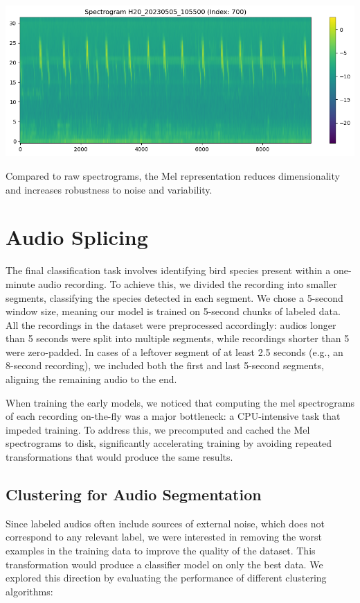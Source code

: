 \documentclass[10pt]{article}
\begin{document}
\begin{center}
  \includegraphics[width=0.7\linewidth]{img/scape_spectrogram.png}
\end{center}

Compared to raw spectrograms, the Mel representation reduces dimensionality and increases robustness to noise and variability. 

\section*{Audio Splicing}

The final classification task involves identifying bird species present within a one-minute audio recording. To achieve this, we divided the recording into smaller segments, classifying the species detected in each segment. We chose a 5-second window size, meaning our model is trained on 5-second chunks of labeled data. All the recordings in the dataset were preprocessed accordingly: audios longer than 5 seconds were split into multiple segments, while recordings shorter than 5 were zero-padded. In cases of a leftover segment of at least 2.5 seconds (e.g., an 8-second recording), we included both the first and last 5-second segments, aligning the remaining audio to the end.

When training the early models, we noticed that computing the mel spectrograms of each recording on-the-fly was a major bottleneck: a CPU-intensive task that impeded training. To address this, we precomputed and cached the Mel spectrograms to disk, significantly accelerating training by avoiding repeated transformations that would produce the same results.

\subsection*{Clustering for Audio Segmentation}

Since labeled audios often include sources of external noise, which does not correspond to any relevant label, we were interested in removing the worst examples in the training data to improve the quality of the dataset. This transformation would produce a classifier model on only the best data. We explored this direction by evaluating the performance of different clustering algorithms:
\end{document}
